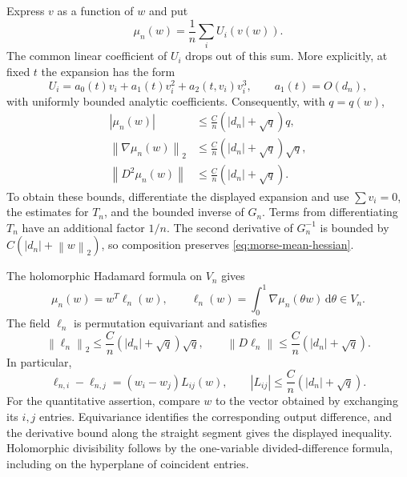 \documentclass[11pt]{article}
\numberwithin{equation}{section}
\theoremstyle{definition}
\newcommand{\dd}{\,\mathrm d}
\newcommand{\norm}[1]{\left\lVert#1\right\rVert}
\begin{document}
Express $v$ as a function of $w$ and put
\begin{equation}
 \mu_n(w)=\frac1n\sum_iU_i(v(w)).
 \label{eq:morse-mean}
\end{equation}
The common linear coefficient of $U_i$ drops out of this sum.  More
explicitly, at fixed $t$ the expansion has the form
\[
 U_i=a_0(t)v_i+a_1(t)v_i^2+a_2(t,v_i)v_i^3,
 \qquad a_1(t)=O(d_n),
\]
with uniformly bounded analytic coefficients.  Consequently, with
$q=q(w)$,
\begin{align}
 |\mu_n(w)|&\le\frac Cn(|d_n|+\sqrt q)q,\label{eq:morse-mean-bound}\\
 \norm{\nabla\mu_n(w)}_2&\le\frac Cn(|d_n|+\sqrt q)\sqrt q,\label{eq:morse-mean-gradient}\\
 \norm{D^2\mu_n(w)}&\le\frac Cn(|d_n|+\sqrt q).
 \label{eq:morse-mean-hessian}
\end{align}
To obtain these bounds, differentiate the displayed expansion and use
$\sum v_i=0$, the estimates for $T_n$, and the bounded inverse of $G_n$.
Terms from differentiating $T_n$ have an additional factor $1/n$.
The second derivative of $G_n^{-1}$ is bounded by
$C(|d_n|+\norm w_2)$, so composition preserves
\eqref{eq:morse-mean-hessian}.

The holomorphic Hadamard formula on $V_n$ gives
\begin{equation}
 \mu_n(w)=w^T\ell_n(w),\qquad
 \ell_n(w)=\int_0^1\nabla\mu_n(\theta w)\dd\theta\in V_n.
 \label{eq:morse-hadamard}
\end{equation}
The field $\ell_n$ is permutation equivariant and satisfies
\begin{equation}
 \norm{\ell_n}_2\le\frac Cn(|d_n|+\sqrt q)\sqrt q,
 \qquad
 \norm{D\ell_n}\le\frac Cn(|d_n|+\sqrt q).
 \label{eq:morse-ell-bounds}
\end{equation}
In particular,
\begin{equation}
 \ell_{n,i}-\ell_{n,j}=(w_i-w_j)L_{ij}(w),
 \qquad |L_{ij}|\le\frac Cn(|d_n|+\sqrt q).
 \label{eq:morse-ell-divided}
\end{equation}
For the quantitative assertion, compare $w$ to the vector obtained by
exchanging its $i,j$ entries.  Equivariance identifies the corresponding
output difference, and the derivative bound along the straight segment
gives the displayed inequality.  Holomorphic divisibility follows by the
one-variable divided-difference formula, including on the hyperplane of
coincident entries.
\end{document}
